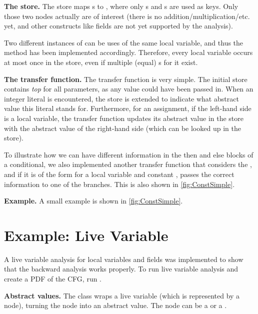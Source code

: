 \textbf{The store.} The store maps s to ,
where only s and s
are used as keys.  Only those two nodes actually are of interest
(there is no addition/multiplication/etc. yet, and other constructs
like fields are not yet supported by the analysis).

Two different instances of  can be uses of the
same local variable, and thus the  method has been
implemented accordingly. Therefore, every local variable occurs at
most once in the store, even if multiple (equal)
s for it exist.

\textbf{The transfer function.} The transfer function is very
simple. The initial store contains \emph{top} for all parameters, as
any value could have been passed in.  When an integer literal is
encountered, the store is extended to indicate what abstract value
this literal stands for. Furthermore, for an assignment, if the
left-hand side is a local variable, the transfer function updates its
abstract value in the store with the abstract value of the right-hand
side (which can be looked up in the store).

To illustrate how we can have different information in the then and
else blocks of a conditional, we also implemented another transfer
function that considers the , and if it is of the
form  for a local variable  and constant
, passes the correct information to one of the branches. This
is also shown in \autoref{fig:ConstSimple}.

\textbf{Example.} A small example is shown in \autoref{fig:ConstSimple}.



\section{Example: Live Variable}
\label{sec:live_variable}

A live variable analysis for local variables and fields was implemented
to show that the backward analysis works properly.
To run live variable analysis and create a PDF of the CFG, run
.

\textbf{Abstract values.} The class  wraps a live
variable (which is represented by a node), turning the node into an
abstract value. The node can be a  or a .


